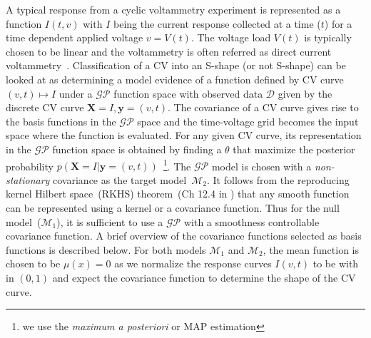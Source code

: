 A typical response from a cyclic voltammetry experiment is represented as a function \(I(t,v)\) with \(I\) being the current response collected at a time (\(t\)) for a time dependent applied voltage \(v=V(t)\). 
The voltage load \(V(t)\) is typically chosen to be linear and the voltammetry is often referred as direct current voltammetry~\cite{li2019application}.
Classification of a CV into an S-shape (or not S-shape) can be looked at as determining a model evidence of a function defined by CV curve \( (v,t) \mapsto I\) under a \(\mathcal{GP}\) function space with observed data \(\mathcal{D}\) given by the discrete CV curve \(\textbf{X} = I, \textbf{y}=(v,t)\). 
The covariance of a CV curve gives rise to the basis functions in the \(\mathcal{GP}\) space and the time-voltage grid becomes the input space where the function is evaluated.
For any given CV curve, its representation in the \(\mathcal{GP}\) function space  is obtained by finding a \(\theta\) that maximize the posterior probability \(p(\textbf{X} = I|\textbf{y}=(v,t))\)~\footnote{we use the \textit{maximum a posteriori} or MAP estimation}.
The \(\mathcal{GP}\) model is chosen with a \textit{non-stationary} covariance as the target model~\(\mathcal{M}_2\). 
It follows from the reproducing kernel Hilbert space~(RKHS) theorem~(Ch 12.4 in \cite{mathML}) that any smooth function can be represented using a kernel or a covariance function.
Thus for the null model~(\(\mathcal{M}_1\)), it is sufficient to use a \(\mathcal{GP}\) with a smoothness controllable covariance function. 
A brief overview of the covariance functions selected as basis functions is described below.
For both models \(\mathcal{M}_1\) and \(\mathcal{M}_2\), the mean function is chosen to be \(\mu(x)=0 \) as we normalize the response curves \(I(v,t)\) to be with in \((0,1)\) and expect the covariance function to determine the shape of the CV curve. 

